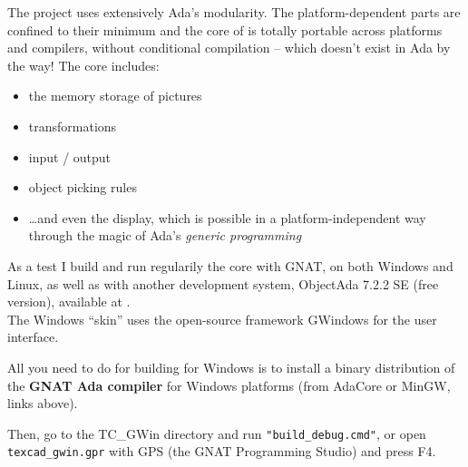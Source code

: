 \documentclass[11pt,a4paper]{article}
\begin{document}
The project uses extensively Ada's modularity.
The platform-dependent parts are confined to their minimum and
the core of {\TC} is totally portable across platforms and
compilers, without conditional compilation -- which doesn't exist in Ada
by the way! The core includes:
%
\begin{itemize}
  \item the memory storage of pictures
  \item transformations
  \item input / output
  \item object picking rules
  \item \ldots and even the display, which is possible in a platform-independent
        way through the magic of Ada's {\em generic programming}
\end{itemize}
%
As a test I build and run regularily the core with GNAT, on both Windows
and Linux, as well as with another development system,
ObjectAda 7.2.2 SE (free version), available at .\\

The Windows ``skin'' uses the open-source framework GWindows for the user interface.

All you need to do for building {\TC} for Windows is to install 
a binary distribution of the {\bf GNAT Ada compiler} for Windows platforms
(from AdaCore or MinGW, links above).

Then, go to the TC\_GWin directory and run {\tt "build\_debug.cmd"},
or open {\tt texcad\_gwin.gpr} with GPS (the GNAT Programming Studio) and press F4.
\end{document}

